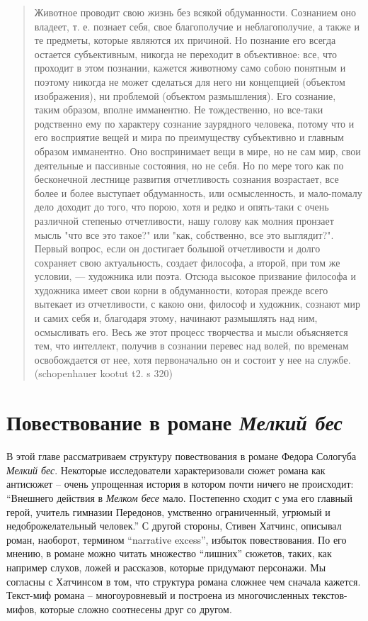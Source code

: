 \documentclass[12pt,a4paper]{article}
\begin{document}
\begin{quote}
Животное проводит свою жизнь без всякой обдуманности. Сознанием оно
владеет, т. е. познает себя, свое благополучие и неблагополучие, а также
и те предметы, которые являются их причиной. Но познание его всегда
остается субъективным, никогда не переходит в объективное: все, что
проходит в этом познании, кажется животному само собою понятным
и поэтому никогда не может сделаться для него ни концепцией (объектом
изображения), ни проблемой (объектом размышления). Его сознание,
таким образом, вполне имманентно. Не тождественно, но все-таки 
родственно ему по характеру сознание заурядного человека, потому что и его
восприятие вещей и мира по преимуществу субъективно и главным
образом имманентно. Оно воспринимает вещи в мире, но не сам мир, свои
деятельные и пассивные состояния, но не себя. Но по мере того как по
бесконечной лестнице развития отчетливость сознания возрастает, все
более и более выступает обдуманность, или осмысленность, и 
мало-помалу дело доходит до того, что порою, хотя и редко и опять-таки
с очень различной степенью отчетливости, нашу голову как молния
пронзает мысль "что все это такое?" или "как, собственно, все это
выглядит?". Первый вопрос, если он достигает большой отчетливости
и долго сохраняет свою актуальность, создает философа, а второй, при
том же условии, — художника или поэта. Отсюда высокое призвание
философа и художника имеет свои корни в обдуманности, которая прежде
всего вытекает из отчетливости, с какою они, философ и художник,
сознают мир и самих себя и, благодаря этому, начинают размышлять над
ним, осмысливать его. Весь же этот процесс творчества и мысли 
объясняется тем, что интеллект, получив в сознании перевес над волей, по временам
освобождается от нее, хотя первоначально он и состоит у нее на службе.
(schopenhauer kootut t2. s 320)
\end{quote}

\section{Повествование в романе \textit{Мелкий бес}}

В этой главе рассматриваем структуру повествования в романе Федора Сологуба \emph{Мелкий бес}. Некоторые исследователи характеризовали сюжет романа как антисюжет -- очень упрощенная история в котором почти ничего не происходит: 
\enquote{Внешнего действия в \emph{Мелком бесе} мало. Постепенно сходит с ума его главный герой, учитель гимназии Передонов, умственно ограниченный, угрюмый и недоброжелательный человек.}
\autocite[432.]{grigorjev1983} С другой стороны, Стивен Хатчинс, описывал роман, наоборот, термином \enquote{narrative excess}, избыток повествования. По его мнению, в романе можно читать множество \enquote{лишних} сюжетов, таких, как например слухов, ложей и рассказов, которые придумают персонажи. \parencite[111--114.]{hutchings1997} Мы согласны с Хатчинсом в том, что структура романа сложнее чем сначала кажется. Текст-миф романа – многоуровневый и построена из многочисленных текстов-мифов, которые сложно соотнесены друг со другом. 
\end{document}
